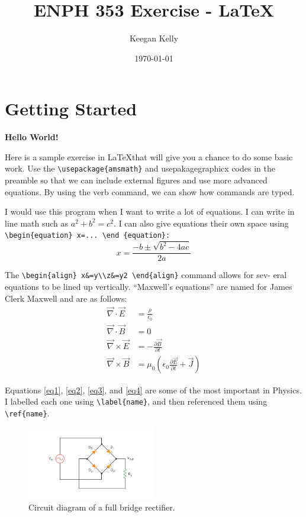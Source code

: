 \documentclass{article}
\title{ENPH 353 Exercise - \LaTeX}
\author{Keegan Kelly}
\date{\today}
\begin{document}
    \maketitle
    \section{Getting Started}
    \textbf{Hello World!} 
    
    Here is a sample exercise in \LaTeX that will give you a chance to do some basic work.  Use the \verb+\usepackage{amsmath}+ and usepakage{graphicx} codes in the preamble so that we can include external figures and use more advanced equations.  By using the verb command, we can show how commands are typed.
    
    I would use this program when I want to write a lot of equations.  I can write in line math such as $a^2+b^2=c^2$. I can also give equations their own space using \verb+\begin{equation} x=... \end {equation}:+ 
    \begin{equation}
        x = \frac{-b \pm\sqrt{b^2-4ac}}{2a}
    \end{equation}
    
   The \verb+\begin{align} x&=y\\z&=y2 \end{align}+ command allows for sev-
eral equations to be lined up vertically. “Maxwell’s equations” are named for
James Clerk Maxwell and are as follows:
   \begin{align}
    \vec{\nabla} \cdot \vec{E} &= \frac{\rho}{\epsilon_0} \label{eq1}\\
    \vec{\nabla}\cdot\vec{B} &= 0 \label{eq2}\\
    \vec{\nabla}\times \vec{E} &= -\frac{\partial\vec{B}}{\partial t} \label{eq3}\\
    \vec{\nabla}\times \vec{B} &= \mu_0 \left(\epsilon_0\frac{\partial\vec{E}}{\partial t}+ \vec{J}\right) \label{eq4}
 \end{align}    

\noindent    
Equations \ref{eq1}, \ref{eq2}, \ref{eq3}, and \ref{eq4} are some of the most important in Physics. I labelled
each one using \verb+\label{name}+, and then referenced them using \verb+\ref{name}+.


\begin{figure}[H]
    \centering
    \includegraphics[width=0.5\textwidth]{Fullwave-Bridge-Rectifier.png}
\caption{Circuit diagram of a full bridge rectifier.}
\end{figure}
\end{document}
